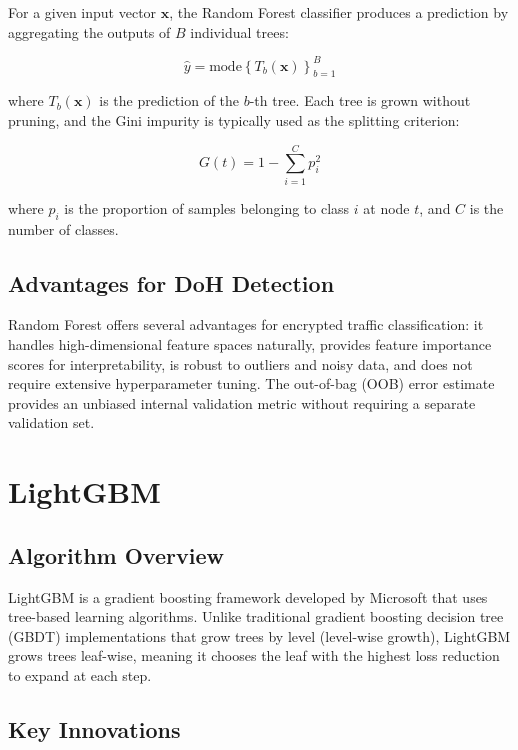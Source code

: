 \documentclass[../Main.tex]{subfiles}
\begin{document}
For a given input vector $\mathbf{x}$, the Random Forest classifier produces a prediction by aggregating the outputs of $B$ individual trees:

\begin{equation}
\hat{y} = \text{mode}\left\{ T_b(\mathbf{x}) \right\}_{b=1}^{B}
\end{equation}

where $T_b(\mathbf{x})$ is the prediction of the $b$-th tree. Each tree is grown without pruning, and the Gini impurity is typically used as the splitting criterion:

\begin{equation}
G(t) = 1 - \sum_{i=1}^{C} p_i^2
\end{equation}

where $p_i$ is the proportion of samples belonging to class $i$ at node $t$, and $C$ is the number of classes.

\subsection{Advantages for DoH Detection}

Random Forest offers several advantages for encrypted traffic classification: it handles high-dimensional feature spaces naturally, provides feature importance scores for interpretability, is robust to outliers and noisy data, and does not require extensive hyperparameter tuning. The out-of-bag (OOB) error estimate provides an unbiased internal validation metric without requiring a separate validation set.

\section{LightGBM}
\label{section:3.5}

\subsection{Algorithm Overview}

LightGBM \cite{ke2017lightgbm} is a gradient boosting framework developed by Microsoft that uses tree-based learning algorithms. Unlike traditional gradient boosting decision tree (GBDT) implementations that grow trees by level (level-wise growth), LightGBM grows trees leaf-wise, meaning it chooses the leaf with the highest loss reduction to expand at each step.

\subsection{Key Innovations}
\end{document}
